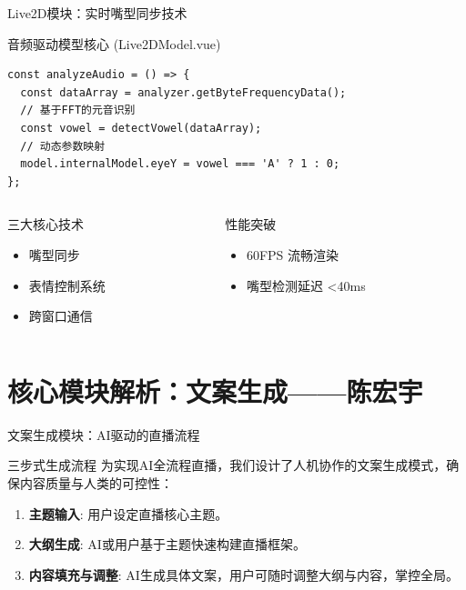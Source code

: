 \documentclass{beamer}
\begin{document}
\begin{frame}[fragile]{Live2D模块：实时嘴型同步技术}
    \begin{block}{音频驱动模型核心 (Live2DModel.vue)}
\begin{lstlisting}[style=jsstyle]
const analyzeAudio = () => {
  const dataArray = analyzer.getByteFrequencyData();
  // 基于FFT的元音识别
  const vowel = detectVowel(dataArray); 
  // 动态参数映射
  model.internalModel.eyeY = vowel === 'A' ? 1 : 0; 
};
\end{lstlisting}
    \end{block}
    \begin{columns}[T]
        \begin{column}{0.5\textwidth}
            \begin{exampleblock}{三大核心技术}
                \begin{itemize}
                    \item 嘴型同步
                    \item 表情控制系统
                    \item 跨窗口通信
                \end{itemize}
            \end{exampleblock}
        \end{column}
        \begin{column}{0.5\textwidth}
            \begin{exampleblock}{性能突破}
                \begin{itemize}
                    \item 60FPS 流畅渲染
                    \item 嘴型检测延迟 <40ms
                \end{itemize}
            \end{exampleblock}
        \end{column}
    \end{columns}
\end{frame}

\section{核心模块解析：文案生成——陈宏宇}

\begin{frame}{文案生成模块：AI驱动的直播流程}

\begin{exampleblock}{三步式生成流程}
为实现AI全流程直播，我们设计了人机协作的文案生成模式，确保内容质量与人类的可控性：
\begin{enumerate}
\item \textbf{主题输入}: 用户设定直播核心主题。
\item \textbf{大纲生成}: AI或用户基于主题快速构建直播框架。
\item \textbf{内容填充与调整}: AI生成具体文案，用户可随时调整大纲与内容，掌控全局。
\end{enumerate}
\end{exampleblock}
\end{frame}
\end{document}
